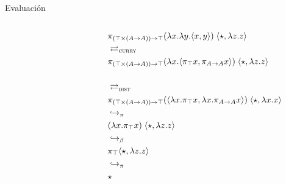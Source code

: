 \begin{frame}{Evaluación}
	\begin{columns}
		\begin{column}{0.5\textwidth}
		\end{column}
		\begin{column}{0.5\textwidth}
			\fontsize{7}{8}\selectfont
			\vspace{4.5em}
			\begin{align*}
				&\pi_{(\top \times (A \rightarrow A) ) \rightarrow \top} (\lambda x. \lambda y. \langle x, y \rangle) \; \langle \star , \lambda z.z \rangle \\
				&\rightleftarrows_{\textsc{curry}} \\
				&\pi_{(\top \times (A \rightarrow A) ) \rightarrow \top} (\lambda x. \langle \pi_\top x , \pi_{A \rightarrow A} x \rangle) \; \langle \star , \lambda z.z \rangle \\
				\\
				&\rightleftarrows_{\textsc{dist}} \\
				&\pi_{(\top \times (A \rightarrow A) ) \rightarrow \top} (\langle \lambda x. \pi_\top x , \lambda x. \pi_{A \rightarrow A} x \rangle) \; \langle \star , \lambda x.x \rangle \\
				&\hookrightarrow_\pi \\
				&(\lambda x. \pi_\top x)\; \langle \star , \lambda z.z \rangle \\
				&\hookrightarrow_\beta \\
				&\pi_\top \langle \star , \lambda z.z \rangle \\
				&\hookrightarrow_\pi \\
				&\star
			\end{align*}
		\end{column}
	\end{columns}
\end{frame}